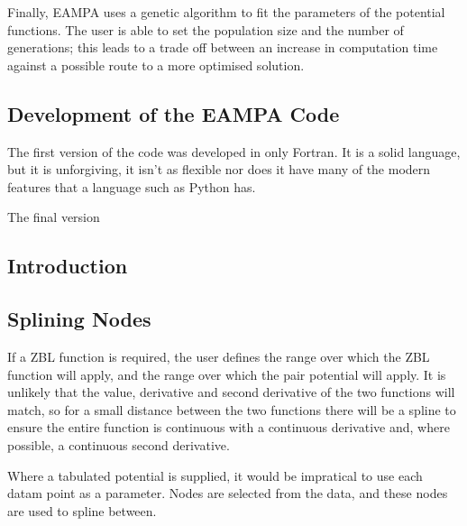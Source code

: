 Finally, EAMPA uses a genetic algorithm to fit the parameters of the potential functions.  The user is able to set the population size and the number of generations; this leads to a trade off between an increase in computation time against a possible route to a more optimised solution.




\subsection{Development of the EAMPA Code}

The first version of the code was developed in only Fortran.  It is a solid language, but it is unforgiving, it isn't as flexible nor does it have many of the modern features that a language such as Python has.

The final version 

























\subsection{Introduction}




\subsection{Splining Nodes}

If a ZBL function is required, the user defines the range over which the ZBL function will apply, and the range over which the pair potential will apply.  It is unlikely that the value, derivative and second derivative of the two functions will match, so for a small distance between the two functions there will be a spline to ensure the entire function is continuous with a continuous derivative and, where possible, a continuous second derivative.

Where a tabulated potential is supplied, it would be impratical to use each datam point as a parameter.  Nodes are selected from the data, and these nodes are used to spline between.

